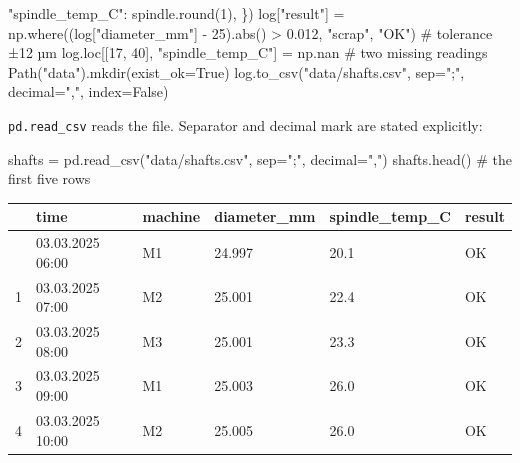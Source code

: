 \documentclass[
  letterpaper,
  DIV=11,
  numbers=noendperiod]{scrreprt}
\newenvironment{Shaded}{\begin{snugshade}}{\end{snugshade}}
\newcommand{\BuiltInTok}[1]{\textcolor[rgb]{0.00,0.23,0.31}{#1}}
\newcommand{\CommentTok}[1]{\textcolor[rgb]{0.37,0.37,0.37}{#1}}
\newcommand{\DecValTok}[1]{\textcolor[rgb]{0.68,0.00,0.00}{#1}}
\newcommand{\FloatTok}[1]{\textcolor[rgb]{0.68,0.00,0.00}{#1}}
\newcommand{\NormalTok}[1]{\textcolor[rgb]{0.00,0.23,0.31}{#1}}
\newcommand{\OperatorTok}[1]{\textcolor[rgb]{0.37,0.37,0.37}{#1}}
\newcommand{\StringTok}[1]{\textcolor[rgb]{0.13,0.47,0.30}{#1}}
\newcommand{\VariableTok}[1]{\textcolor[rgb]{0.07,0.07,0.07}{#1}}
\begin{document}
\begin{Shaded}
\begin{Highlighting}[]
    \StringTok{"spindle\_temp\_C"}\NormalTok{: spindle.}\BuiltInTok{round}\NormalTok{(}\DecValTok{1}\NormalTok{),}
\NormalTok{\})}
\NormalTok{log[}\StringTok{"result"}\NormalTok{] }\OperatorTok{=}\NormalTok{ np.where((log[}\StringTok{"diameter\_mm"}\NormalTok{] }\OperatorTok{{-}} \DecValTok{25}\NormalTok{).}\BuiltInTok{abs}\NormalTok{() }\OperatorTok{\textgreater{}} \FloatTok{0.012}\NormalTok{, }\StringTok{"scrap"}\NormalTok{, }\StringTok{"OK"}\NormalTok{)   }\CommentTok{\# tolerance ±12 µm}
\NormalTok{log.loc[[}\DecValTok{17}\NormalTok{, }\DecValTok{40}\NormalTok{], }\StringTok{"spindle\_temp\_C"}\NormalTok{] }\OperatorTok{=}\NormalTok{ np.nan                            }\CommentTok{\# two missing readings}
\NormalTok{Path(}\StringTok{"data"}\NormalTok{).mkdir(exist\_ok}\OperatorTok{=}\VariableTok{True}\NormalTok{)}
\NormalTok{log.to\_csv(}\StringTok{"data/shafts.csv"}\NormalTok{, sep}\OperatorTok{=}\StringTok{";"}\NormalTok{, decimal}\OperatorTok{=}\StringTok{","}\NormalTok{, index}\OperatorTok{=}\VariableTok{False}\NormalTok{)}
\end{Highlighting}
\end{Shaded}

\texttt{pd.read\_csv} reads the file. Separator and decimal mark are
stated explicitly:

\begin{Shaded}
\begin{Highlighting}[]
\NormalTok{shafts }\OperatorTok{=}\NormalTok{ pd.read\_csv(}\StringTok{"data/shafts.csv"}\NormalTok{, sep}\OperatorTok{=}\StringTok{";"}\NormalTok{, decimal}\OperatorTok{=}\StringTok{","}\NormalTok{)}
\NormalTok{shafts.head()            }\CommentTok{\# the first five rows}
\end{Highlighting}
\end{Shaded}

\begin{longtable}[]{@{}llllll@{}}
\toprule\noalign{}
& time & machine & diameter\_mm & spindle\_temp\_C & result \\
\midrule\noalign{}
\endhead
\bottomrule\noalign{}
\endlastfoot
0 & 03.03.2025 06:00 & M1 & 24.997 & 20.1 & OK \\
1 & 03.03.2025 07:00 & M2 & 25.001 & 22.4 & OK \\
2 & 03.03.2025 08:00 & M3 & 25.001 & 23.3 & OK \\
3 & 03.03.2025 09:00 & M1 & 25.003 & 26.0 & OK \\
4 & 03.03.2025 10:00 & M2 & 25.005 & 26.0 & OK \\
\end{longtable}
\end{document}
